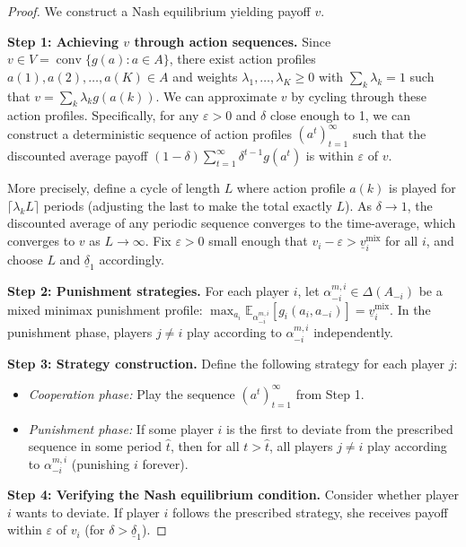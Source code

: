 \documentclass[11pt,a4paper]{article}
\theoremstyle{definition}
\theoremstyle{plain}
\theoremstyle{remark}
\newcommand{\E}{\mathbb{E}}
\DeclareMathOperator{\conv}{conv}
\begin{document}
\begin{proof}
We construct a Nash equilibrium yielding payoff $v$.

\textbf{Step 1: Achieving $v$ through action sequences.}
Since $v \in V = \conv\{g(a) : a \in A\}$, there exist action profiles
$a(1), a(2), \ldots, a(K) \in A$ and weights $\lambda_1, \ldots, \lambda_K \geq 0$ with
$\sum_k \lambda_k = 1$ such that $v = \sum_k \lambda_k g(a(k))$. We can approximate $v$
by cycling through these action profiles. Specifically, for any $\varepsilon > 0$ and
$\delta$ close enough to 1, we can construct a deterministic sequence of action profiles
$(a^t)_{t=1}^\infty$ such that the discounted average payoff
$(1-\delta)\sum_{t=1}^\infty \delta^{t-1} g(a^t)$ is within $\varepsilon$ of $v$.

More precisely, define a cycle of length $L$ where action profile $a(k)$ is played for
$\lceil \lambda_k L \rceil$ periods (adjusting the last to make the total exactly $L$).
As $\delta \to 1$, the discounted average of any periodic sequence converges to the
time-average, which converges to $v$ as $L \to \infty$. Fix $\varepsilon > 0$ small enough
that $v_i - \varepsilon > \underline{v}_i^{\text{mix}}$ for all $i$, and choose $L$ and
$\underline{\delta}_1$ accordingly.

\textbf{Step 2: Punishment strategies.}
For each player $i$, let $\alpha_{-i}^{m,i} \in \Delta(A_{-i})$ be a mixed minimax
punishment profile:
$\max_{a_i} \E_{\alpha_{-i}^{m,i}}[g_i(a_i, a_{-i})] = \underline{v}_i^{\text{mix}}$.
In the punishment phase, players $j \neq i$ play according to $\alpha_{-i}^{m,i}$
independently.

\textbf{Step 3: Strategy construction.}
Define the following strategy for each player $j$:
\begin{itemize}
    \item \emph{Cooperation phase:} Play the sequence $(a^t)_{t=1}^\infty$ from Step 1.
    \item \emph{Punishment phase:} If some player $i$ is the first to deviate from the
    prescribed sequence in some period $\hat{t}$, then for all $t > \hat{t}$, all players
    $j \neq i$ play according to $\alpha_{-i}^{m,i}$ (punishing $i$ forever).
\end{itemize}

\textbf{Step 4: Verifying the Nash equilibrium condition.}
Consider whether player $i$ wants to deviate. If player $i$ follows the prescribed strategy,
she receives payoff within $\varepsilon$ of $v_i$ (for $\delta > \underline{\delta}_1$).


\end{proof}
\end{document}
